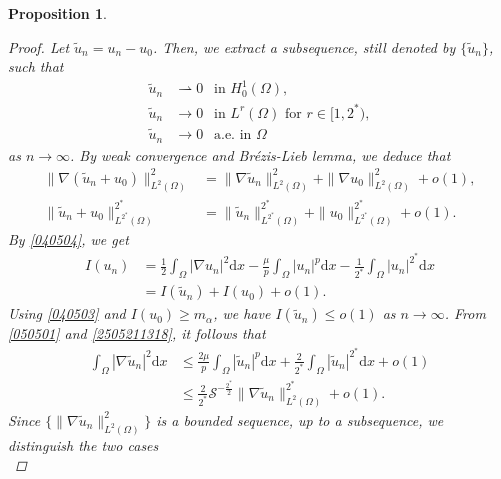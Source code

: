 \documentclass[10pt,a4paper]{amsart}
\newtheorem{proposition}{Proposition}
\newcommand{\ud}{\mathrm{d}}
\begin{document}
\begin{proposition}
\begin{proof}
Let $\tilde{u}_n=u_n-u_0$. Then, we extract a subsequence, still denoted by $\{\tilde{u}_n\}$, such that
\begin{equation}\label{2505211318}
\begin{aligned}
\tilde{u}_n&\rightharpoonup 0 ~~\text{ in } H^1_0(\Omega), \\
\tilde{u}_n&\rightarrow 0 ~~\text{ in } L^{r}(\Omega) \text{ for } r\in[1,2^{*}),\\
\tilde{u}_n&\rightarrow 0 ~~\text{ a.e.}\text{ in }\Omega
\end{aligned}
\end{equation}
as $n \rightarrow \infty$. By weak convergence and Br\'{e}zis-Lieb lemma, we deduce that
\begin{equation}\label{040504}
\begin{aligned}
\|\nabla (\tilde{u}_n+u_0)\|^2_{L^{2}(\Omega)}
&=\|\nabla \tilde{u}_n\|^2_{L^{2}(\Omega)}+\|\nabla u_0\|^2_{L^{2}(\Omega)}+o(1), \\
\|\tilde{u}_n+u_0\|^{2^{*}}_{L^{2^{*}}(\Omega)}
&=\|\tilde{u}_n\|^{2^{*}}_{L^{2^{*}}(\Omega)}+\|u_0\|^{2^{*}}_{L^{2^{*}}(\Omega)}+o(1).
\end{aligned}
\end{equation}
By \eqref{040504}, we get
\begin{equation*}
\begin{aligned}
I(u_n)&=\frac{1}{2}\int_{\Omega}|\nabla u_n|^2 \ud x
-\frac{\mu}{p}\int_{\Omega}|u_n|^{p} \ud x
-\frac{1}{2^{*}}\int_{\Omega}|u_n|^{2^{*}} \ud x\\
&=I(\tilde{u}_n)+I(u_0)+o(1).
\end{aligned}
\end{equation*}
Using \eqref{040503} and $I(u_0)\geq m_{\alpha}$, we have $I(\tilde{u}_n)\leq o(1)$ as $n \rightarrow \infty$. From \eqref{050501} and \eqref{2505211318}, it follows that
\begin{equation}\label{050604}
\begin{aligned}
\int_{\Omega}|\nabla \tilde{u}_n|^2 \ud x
&\leq\frac{2\mu}{p}\int_{\Omega}|\tilde{u}_n|^{p} \ud x
+\frac{2}{2^{*}}\int_{\Omega}|\tilde{u}_n|^{2^{*}} \ud x+o(1)\\
&\le\frac{2}{2^{*}}\mathcal{S}^{-\frac{2^{*}}{2}}\|\nabla \tilde{u}_n\|^{2^{*}}_{L^{2}(\Omega)}+o(1).
\end{aligned}
\end{equation}
Since $\{\|\nabla \tilde{u}_n\|^{2}_{L^{2}(\Omega)}\}$ is a bounded sequence, up to a subsequence, we distinguish the two cases
\begin{equation*}

\end{equation*}
\end{proof}
\end{proposition}
\end{document}
